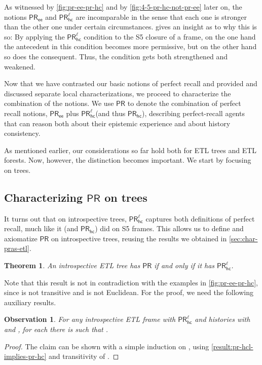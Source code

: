\documentclass{article}
\newcommand{\PR}{\ensuremath{\mathsf{PR}}\xspace}
\newcommand{\PRhc}{\ensuremath{\mathsf{PR_{hc}}}\xspace}
\newcommand{\PRhcl}{\ensuremath{\mathsf{PR_{hc}^\ell}}\xspace}
\newcommand{\PRee}{\ensuremath{\mathsf{PR_{ee}}}\xspace}
\newcommand{\tiff}{if and only if\xspace}
\newcounter{#1}
\newtheorem{observation}{Observation}[section]
\newtheorem{observation}{Observation}
\newtheorem{theorem}{Theorem}[section]
\begin{document}
As witnessed by \cref{fig:pr-ee-pr-hc} and by \cref{fig:4-5-pr-hc-not-pr-ee} later on,
the notions \PRee and \PRhcl are incomparable in the sense that
each one is stronger than the other one under certain circumstances.
 gives an insight as to why this is so:
By applying the \PRhcl condition to the S5 closure of a frame,
on the one hand the antecedent in this condition becomes more permissive,
but on the other hand so does the consequent.
Thus, the condition gets both strengthened and weakened.

\bigskip

Now that we have contrasted our basic notions of perfect recall
and provided and discussed separate local characterizations,
we proceed to characterize the combination of the notions.
We use \PR to denote the combination of perfect recall notions,
\PRee plus \PRhcl (and thus \PRhc),
describing perfect-recall agents that can reason both
about their epistemic experience and about history consistency.

As mentioned earlier,
our considerations so far hold both for ETL trees and ETL forests.
Now, however, the distinction becomes important.
We start by focusing on trees.

\subsection{Characterizing \PR on trees}

It turns out that on introspective trees, \PRhcl captures both definitions of perfect recall,
much like it (and \PRhc) did on S5 frames.
This allows us to define and axiomatize \PR on introspective trees,
reusing the results we obtained in \cref{sec:char-pras-etl}.

\begin{theorem}
  \label{result:pr-hcl-equiv-pr}
  An introspective ETL tree has \PR \tiff it has \PRhcl.
\end{theorem}

Note that this result is not in contradiction with the examples in \cref{fig:pr-ee-pr-hc},
since  is not transitive and  is not Euclidean.
For the proof, we need the following auxiliary results.

\begin{observation}
  \label{result:acc-along-history}
  For any introspective ETL frame with \PRhcl and
  histories  with  and ,
  for each  there is  such that .
\end{observation}
\begin{proof}
  The claim can be shown with a simple induction on ,
  using \cref{result:pr-hcl-implies-pr-hc} and transitivity of .
\end{proof}
\end{document}
